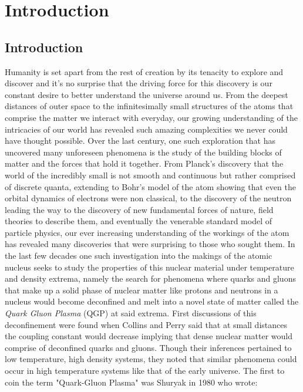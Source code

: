 \chapter{Introduction}


\section{Introduction}
Humanity is set apart from the rest of creation by its tenacity to explore and discover and it's no surprise that the driving force for this discovery is our constant desire to better understand the universe around us. From the deepest distances of outer space to the infinitesimally small structures of the atoms that comprise the matter we interact with everyday, our growing understanding of the intricacies of our world has revealed such amazing complexities we never could have thought possible. Over the last century, one such exploration that has uncovered many unforeseen phenomena is the study of the building blocks of matter and the forces that hold it together. From Planck's discovery that the world of the incredibly small is not smooth and continuous but rather comprised of discrete quanta, extending to Bohr's model of the atom showing that even the orbital dynamics of electrons were non classical, to the discovery of the neutron leading the way to the discovery of new fundamental forces of nature, field theories to describe them, and eventually the venerable standard model of particle physics, our ever increasing understanding of the workings of the atom has revealed many discoveries that were surprising to those who sought them. In the last few decades one such investigation into the makings of the atomic nucleus seeks to study the properties of this nuclear material under temperature and density extrema, namely the search for phenomena where quarks and gluons that make up a solid phase of nuclear matter like protons and neutrons in a nucleus would become deconfined and melt into a novel state of matter called the \textit{Quark Gluon Plasma} (QGP) at said extrema. 
First discussions of this deconfinement were found when Collins and Perry \citep{Collins:1974ky} said that at small distances the coupling constant would decrease implying that dense nuclear matter would comprise of deconfined quarks and gluons. Though their inferences pertained to low temperature, high density systems, they noted that similar phenomena could occur in high temperature systems like that of the early universe. The first to coin the term "Quark-Gluon Plasma" was Shuryak in 1980 \citep{Shuryak:1980tp} who wrote: 

